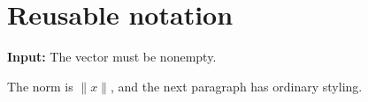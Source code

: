\documentclass{article}
\newcommand{\norm}[1]{\lVert #1\rVert}
\newcommand{\warning}[2][Note]{{\bfseries #1:} #2\par}
\begin{document}
\section{Reusable notation}
\warning[Input]{The vector must be nonempty.}
The norm is $\norm{x}$, and the next paragraph has ordinary styling.
\end{document}
